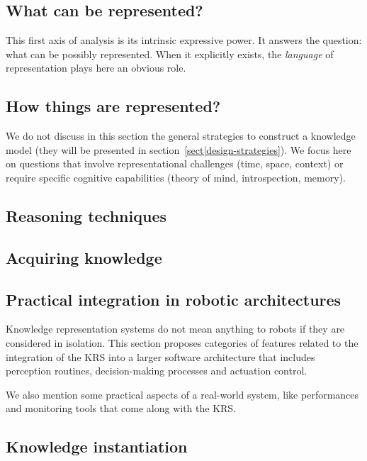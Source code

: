 \subsection{What can be represented?}
\label{sect|expressiveness}

This first axis of analysis is its intrinsic expressive power. It answers the
question: what can be possibly represented. When it explicitly exists, the
\emph{language} of representation plays here an obvious role.

\subsection{How things are represented?}
\label{sect|higher-level-domain-representation}

We do not discuss in this section the general strategies to construct a
knowledge model (they will be presented in
section~\ref{sect|design-strategies}). We focus here on questions that involve
representational challenges (time, space, context) or require specific
cognitive capabilities (theory of mind, introspection, memory).


\subsection{Reasoning techniques}

\subsection{Acquiring knowledge}

\subsection{Practical integration in robotic architectures}
\label{sect|integration-robot}


Knowledge representation systems do not mean anything to robots if they are
considered in isolation. This section proposes categories of features related
to the integration of the KRS into a larger software architecture that includes
perception routines, decision-making processes and actuation control.

We also mention some practical aspects of a real-world system, like
performances and monitoring tools that come along with the KRS.

\subsection{Knowledge instantiation}

